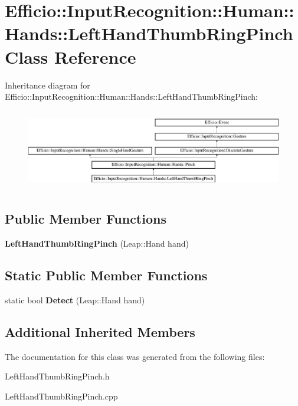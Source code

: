 \hypertarget{class_efficio_1_1_input_recognition_1_1_human_1_1_hands_1_1_left_hand_thumb_ring_pinch}{}\section{Efficio\+:\+:Input\+Recognition\+:\+:Human\+:\+:Hands\+:\+:Left\+Hand\+Thumb\+Ring\+Pinch Class Reference}
\label{class_efficio_1_1_input_recognition_1_1_human_1_1_hands_1_1_left_hand_thumb_ring_pinch}
Inheritance diagram for Efficio\+:\+:Input\+Recognition\+:\+:Human\+:\+:Hands\+:\+:Left\+Hand\+Thumb\+Ring\+Pinch\+:\begin{figure}[H]
\begin{center}
\leavevmode
\includegraphics[height=3.562341cm]{class_efficio_1_1_input_recognition_1_1_human_1_1_hands_1_1_left_hand_thumb_ring_pinch}
\end{center}
\end{figure}
\subsection*{Public Member Functions}
\begin{DoxyCompactItemize}
\item 
{\bfseries Left\+Hand\+Thumb\+Ring\+Pinch} (Leap\+::\+Hand hand)\hypertarget{class_efficio_1_1_input_recognition_1_1_human_1_1_hands_1_1_left_hand_thumb_ring_pinch_ade246455967ecc14d456b179875e51ad}{}\label{class_efficio_1_1_input_recognition_1_1_human_1_1_hands_1_1_left_hand_thumb_ring_pinch_ade246455967ecc14d456b179875e51ad}

\end{DoxyCompactItemize}
\subsection*{Static Public Member Functions}
\begin{DoxyCompactItemize}
\item 
static bool {\bfseries Detect} (Leap\+::\+Hand hand)\hypertarget{class_efficio_1_1_input_recognition_1_1_human_1_1_hands_1_1_left_hand_thumb_ring_pinch_aeaee0bc3251ad9d188c654d42ba5faaf}{}\label{class_efficio_1_1_input_recognition_1_1_human_1_1_hands_1_1_left_hand_thumb_ring_pinch_aeaee0bc3251ad9d188c654d42ba5faaf}

\end{DoxyCompactItemize}
\subsection*{Additional Inherited Members}


The documentation for this class was generated from the following files\+:\begin{DoxyCompactItemize}
\item 
Left\+Hand\+Thumb\+Ring\+Pinch.\+h\item 
Left\+Hand\+Thumb\+Ring\+Pinch.\+cpp\end{DoxyCompactItemize}
